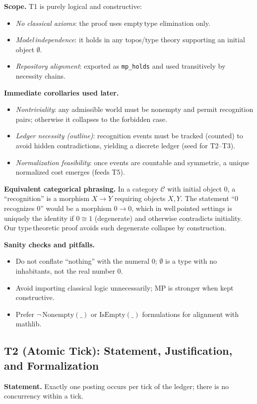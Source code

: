 \documentclass[11pt]{article}
\begin{document}
\textbf{Scope.} T1 is purely logical and constructive:
\begin{itemize}[leftmargin=*]
  \item \emph{No classical axioms}: the proof uses empty\,type elimination only.
  \item \emph{Model\,independence}: it holds in any topos/type theory supporting an initial object $\emptyset$.
  \item \emph{Repository alignment}: exported as \texttt{mp\_holds} and used transitively by necessity chains.
\end{itemize}

\textbf{Immediate corollaries used later.}
\begin{itemize}[leftmargin=*]
  \item \emph{Nontriviality}: any admissible world must be nonempty and permit recognition pairs; otherwise it collapses to the forbidden case.
  \item \emph{Ledger necessity (outline)}: recognition events must be tracked (counted) to avoid hidden contradictions, yielding a discrete ledger (seed for T2–T3).
  \item \emph{Normalization feasibility}: once events are countable and symmetric, a unique normalized cost emerges (feeds T5).
\end{itemize}

\textbf{Equivalent categorical phrasing.} In a category $\mathcal C$ with initial object $0$, a “recognition” is a morphism $X\to Y$ requiring objects $X,Y$. The statement “$0$ recognizes $0$” would be a morphism $0\to 0$, which in well\,pointed settings is uniquely the identity if $0\cong 1$ (degenerate) and otherwise contradicts initiality. Our type\,theoretic proof avoids such degenerate collapse by construction.

\textbf{Sanity checks and pitfalls.}
\begin{itemize}[leftmargin=*]
  \item Do not conflate “nothing” with the numeral $0$; $\emptyset$ is a type with no inhabitants, not the real number $0$.
  \item Avoid importing classical logic unnecessarily; MP is stronger when kept constructive.
  \item Prefer $\neg\,\mathrm{Nonempty}(\_)$ or $\mathrm{IsEmpty}(\_)$ formulations for alignment with mathlib.
\end{itemize}

\subsection*{T2 (Atomic Tick): Statement, Justification, and Formalization}
\textbf{Statement.} Exactly one posting occurs per tick of the ledger; there is no concurrency within a tick.
\end{document}

